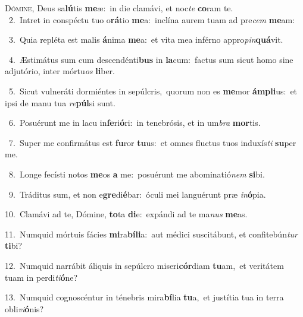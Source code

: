 \lettrine{\initial\textcolor{\initialcolor}{D}}{ómine,} Deus sa\-\textbf{lú}\-tis \textbf{me}\-æ:~\star in die clamávi, et noc\textit{te} \textbf{co}\-ram te.\\
{\numbfont\textcolor{\numbcolor}{~2.}}~Intret in conspéctu tuo o\-\textbf{rá}\-tio \textbf{me}\-a:~\star inclína aurem tuam ad pre\textit{cem} \textbf{me}\-am:\par
{\numbfont\textcolor{\numbcolor}{~3.}}~Quia repléta est malis \textbf{á}\-nima \textbf{me}\-a:~\star et vita mea inférno appro\-\textit{pin}\-\textbf{quá}vit.\par
{\numbfont\textcolor{\numbcolor}{~4.}}~Æstimátus sum cum descendénti\textbf{bus} in \textbf{la}\-cum:~\star factus sum sicut homo sine adjutório, inter mórtu\textit{os} \textbf{li}\-ber.\par
{\numbfont\textcolor{\numbcolor}{~5.}}~Sicut vulneráti dormiéntes in sepúlcris,~\dagger quorum non es \textbf{me}\-mor \textbf{ám}\-\textbf{pli}us:~\star et ipsi de manu tua \textit{re}\-\textbf{púl}si sunt.\par
{\numbfont\textcolor{\numbcolor}{~6.}}~Posuérunt me in lacu in\-\textbf{fe}\-ri\-\textbf{ó}\-ri:~\star in tenebrósis, et in um\textit{bra} \textbf{mor}\-tis.\par
{\numbfont\textcolor{\numbcolor}{~7.}}~Super me confirmátus est \textbf{fu}\-ror \textbf{tu}\-us:~\star et omnes fluctus tuos induxís\textit{ti} \textbf{su}\-per me.\par
{\numbfont\textcolor{\numbcolor}{~8.}}~Longe fecísti notos \textbf{me}\-os \textbf{a} me:~\star posuérunt me abominatió\textit{nem} \textbf{si}\-bi.\par
{\numbfont\textcolor{\numbcolor}{~9.}}~Tráditus sum, et non e\-\textbf{gre}\-di\-\textbf{é}\-bar:~\star óculi mei languérunt præ \textit{in}\-\textbf{ó}pia.\par
{\numbfont\textcolor{\numbcolor}{10.}}~Clamávi ad te, Dómine, \textbf{to}\-ta \textbf{di}\-e:~\star expándi ad te ma\textit{nus} \textbf{me}\-as.\par
{\numbfont\textcolor{\numbcolor}{11.}}~Numquid mórtuis fácies \textbf{mi}\-ra\-\textbf{bí}\-\textbf{li}a:~\star aut médici suscitábunt, et confitebún\textit{tur} \textbf{ti}\-bi?\par
{\numbfont\textcolor{\numbcolor}{12.}}~Numquid narrábit áliquis in sepúlcro miseri\-\textbf{cór}\-diam \textbf{tu}\-am,~\star et veritátem tuam in perdi\-\textit{ti}\-\textbf{ó}ne?\par
{\numbfont\textcolor{\numbcolor}{13.}}~Numquid cognoscéntur in ténebris mira\-\textbf{bí}\-lia \textbf{tu}\-a,~\star et justítia tua in terra obli\-\textit{vi}\-\textbf{ó}nis?\par
